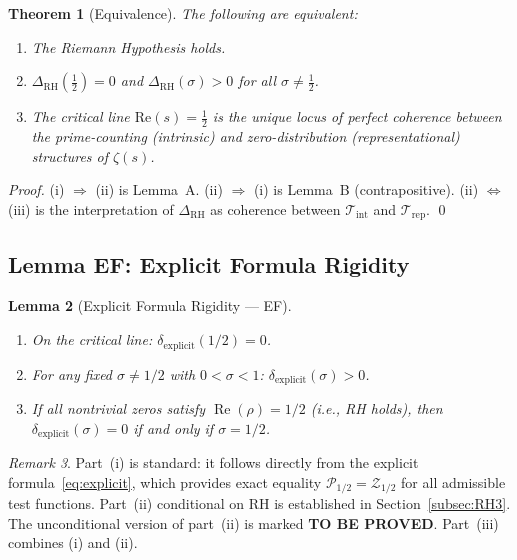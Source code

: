 \documentclass[11pt]{article}
\newtheorem{theorem}{Theorem}[section]
\newtheorem{lemma}[theorem]{Lemma}
\theoremstyle{remark}
\newtheorem{remark}[theorem]{Remark}
\DeclareMathOperator{\Rea}{Re}
\begin{document}

\begin{theorem}[Equivalence]
\label{thm:rh-equiv}
The following are equivalent:
\begin{enumerate}
  \item[(i)] The Riemann Hypothesis holds.
  \item[(ii)] $\Delta_{\mathrm{RH}}(\tfrac{1}{2}) = 0$ and $\Delta_{\mathrm{RH}}(\sigma) > 0$ for all $\sigma \neq \tfrac{1}{2}$.
  \item[(iii)] The critical line $\mathrm{Re}(s) = \tfrac{1}{2}$ is the unique locus of perfect coherence between the prime-counting (intrinsic) and zero-distribution (representational) structures of $\zeta(s)$.
\end{enumerate}
\end{theorem}

\begin{proof}
(i) $\Rightarrow$ (ii) is Lemma~A. (ii) $\Rightarrow$ (i) is Lemma~B (contrapositive). (ii) $\Leftrightarrow$ (iii) is the interpretation of $\Delta_{\mathrm{RH}}$ as coherence between $\mathcal{T}_{\mathrm{int}}$ and $\mathcal{T}_{\mathrm{rep}}$. \qed
\end{proof}


\subsection{Lemma EF: Explicit Formula Rigidity}

\begin{lemma}[Explicit Formula Rigidity --- EF]
\label{lem:EF}
\hfill
\begin{enumerate}
  \item[(i)] On the critical line:
    $\delta_{\mathrm{explicit}}(1/2) = 0$.
  \item[(ii)] For any fixed $\sigma\neq 1/2$ with $0<\sigma<1$:
    $\delta_{\mathrm{explicit}}(\sigma) > 0$.
  \item[(iii)] If all nontrivial zeros satisfy $\Rea(\rho)=1/2$ (i.e., RH holds), then
    $\delta_{\mathrm{explicit}}(\sigma)=0$ if and only if $\sigma=1/2$.
\end{enumerate}
\end{lemma}

\begin{remark}
Part~(i) is standard: it follows directly from the explicit formula~\eqref{eq:explicit},
which provides exact equality $\mathcal{P}_{1/2}=\mathcal{Z}_{1/2}$ for all admissible
test functions.
Part~(ii) conditional on RH is established in Section~\ref{subsec:RH3}.
The unconditional version of part~(ii) is marked \textbf{TO BE PROVED}.
Part~(iii) combines (i) and (ii).
\end{remark}
\end{document}
